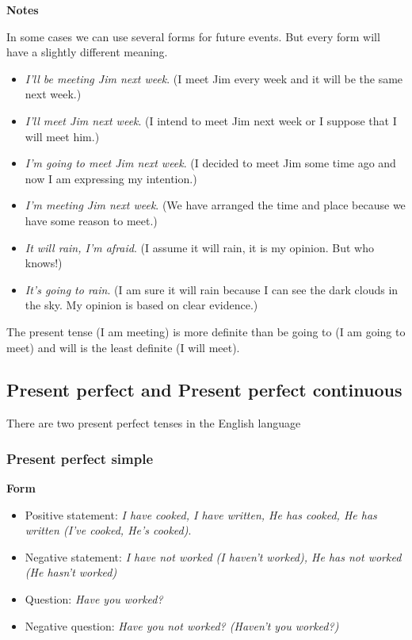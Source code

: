 \begin{itemize}
\textbf{Notes}

In some cases we can use several forms for future events. But every form will have a slightly different meaning.

\begin{itemize}

\item \textit{I'll be meeting Jim next week}. (I meet Jim every week and it will be the same next week.)
\item \textit{I'll meet Jim next week}. (I intend to meet Jim next week or I suppose that I will meet him.)
\item \textit{I'm going to meet Jim next week}. (I decided to meet Jim some time ago and now I am expressing my intention.)
\item \textit{I'm meeting Jim next week}. (We have arranged the time and place because we have some reason to meet.)
\item \textit{It will rain, I'm afraid}. (I assume it will rain, it is my opinion. But who knows!) 
\item \textit{It's going to rain}. (I am sure it will rain because I can see the dark clouds in the sky. My opinion is based on clear evidence.)

\end{itemize}

The present tense (I am meeting) is more definite than be going to (I am going to meet) and will is the least definite (I will meet).

\end{itemize}

\subsection{Present perfect and Present perfect continuous}

There are two present perfect tenses in the English language

\subsubsection{Present perfect simple}

\textbf{Form}

\begin{itemize}

\item Positive statement: \textit{I have cooked, I have written, He has cooked, He has written (I've cooked, He's cooked)}.
\item Negative statement: \textit{I have not worked (I haven't worked), He has not worked (He hasn't worked)}
\item Question: \textit{Have you worked?}
\item Negative question: \textit{Have you not worked? (Haven't you worked?)}

\end{itemize}


